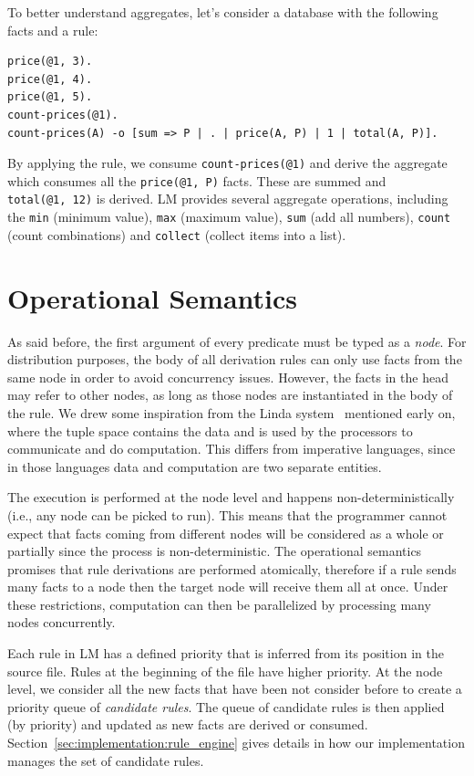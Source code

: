 To better understand aggregates, let's consider a database with the following
facts and a rule:

\begin{Verbatim}[fontsize=\codesize]
price(@1, 3).
price(@1, 4).
price(@1, 5).
count-prices(@1).
count-prices(A) -o [sum => P | . | price(A, P) | 1 | total(A, P)].
\end{Verbatim}

By applying the rule, we consume \texttt{count-prices(@1)} and derive the
aggregate which consumes all the \texttt{price(@1, P)} facts.  These are summed
and \texttt{total(@1,~12)} is derived. LM provides several aggregate operations,
including the \texttt{min} (minimum value), \texttt{max} (maximum value),
\texttt{sum} (add all numbers), \texttt{count} (count combinations) and
\texttt{collect} (collect items into a list).

\section{Operational Semantics}

As said before, the first argument of every predicate must be typed as a
\emph{node}.  For distribution purposes, the body of all derivation rules can
only use facts from the same node in order to avoid concurrency issues.
However, the facts in the head may refer to other nodes, as long as those nodes
are instantiated in the body of the rule.  We drew some inspiration from the
Linda system~\cite{linda} mentioned early on, where the tuple space contains
the data and is used by the processors to communicate and do computation.  This
differs from imperative languages, since in those languages data and computation
are two separate entities.

The execution is performed at the node level and happens non-deterministically
(i.e., any node can be picked to run). This means that the programmer cannot
expect that facts coming from different nodes will be considered as a whole or
partially since the process is non-deterministic. The operational semantics
promises that rule derivations are performed atomically, therefore if a rule
sends many facts to a node then the target node will receive them all at once.
Under these restrictions, computation can then be parallelized by processing
many nodes concurrently.

Each rule in LM has a defined priority that is inferred from its position in the
source file.  Rules at the beginning of the file have higher priority. At the
node level, we consider all the new facts that have been not consider before to
create a priority queue of \emph{candidate rules}.  The queue of candidate rules
is then applied (by priority) and updated as new facts are derived or consumed.
Section~\ref{sec:implementation:rule_engine} gives details in how our
implementation manages the set of candidate rules.

